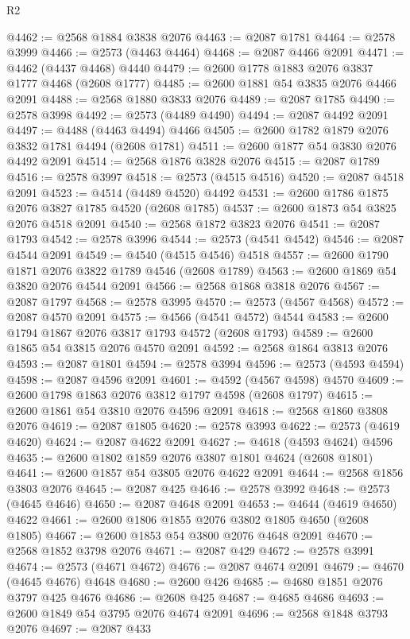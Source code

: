 \begin{lexlean}{R2}
\begin{coremodule}
@4462 := @2568 @1884 @3838 @2076
@4463 := @2087 @1781
@4464 := @2578 @3999
@4466 := @2573 (@4463 @4464)
@4468 := @2087 @4466 @2091
@4471 := @4462 (@4437 @4468) @4440
@4479 := @2600 @1778 @1883 @2076 @3837 @1777 @4468 (@2608 @1777)
@4485 := @2600 @1881 @54 @3835 @2076 @4466 @2091
@4488 := @2568 @1880 @3833 @2076
@4489 := @2087 @1785
@4490 := @2578 @3998
@4492 := @2573 (@4489 @4490)
@4494 := @2087 @4492 @2091
@4497 := @4488 (@4463 @4494) @4466
@4505 := @2600 @1782 @1879 @2076 @3832 @1781 @4494 (@2608 @1781)
@4511 := @2600 @1877 @54 @3830 @2076 @4492 @2091
@4514 := @2568 @1876 @3828 @2076
@4515 := @2087 @1789
@4516 := @2578 @3997
@4518 := @2573 (@4515 @4516)
@4520 := @2087 @4518 @2091
@4523 := @4514 (@4489 @4520) @4492
@4531 := @2600 @1786 @1875 @2076 @3827 @1785 @4520 (@2608 @1785)
@4537 := @2600 @1873 @54 @3825 @2076 @4518 @2091
@4540 := @2568 @1872 @3823 @2076
@4541 := @2087 @1793
@4542 := @2578 @3996
@4544 := @2573 (@4541 @4542)
@4546 := @2087 @4544 @2091
@4549 := @4540 (@4515 @4546) @4518
@4557 := @2600 @1790 @1871 @2076 @3822 @1789 @4546 (@2608 @1789)
@4563 := @2600 @1869 @54 @3820 @2076 @4544 @2091
@4566 := @2568 @1868 @3818 @2076
@4567 := @2087 @1797
@4568 := @2578 @3995
@4570 := @2573 (@4567 @4568)
@4572 := @2087 @4570 @2091
@4575 := @4566 (@4541 @4572) @4544
@4583 := @2600 @1794 @1867 @2076 @3817 @1793 @4572 (@2608 @1793)
@4589 := @2600 @1865 @54 @3815 @2076 @4570 @2091
@4592 := @2568 @1864 @3813 @2076
@4593 := @2087 @1801
@4594 := @2578 @3994
@4596 := @2573 (@4593 @4594)
@4598 := @2087 @4596 @2091
@4601 := @4592 (@4567 @4598) @4570
@4609 := @2600 @1798 @1863 @2076 @3812 @1797 @4598 (@2608 @1797)
@4615 := @2600 @1861 @54 @3810 @2076 @4596 @2091
@4618 := @2568 @1860 @3808 @2076
@4619 := @2087 @1805
@4620 := @2578 @3993
@4622 := @2573 (@4619 @4620)
@4624 := @2087 @4622 @2091
@4627 := @4618 (@4593 @4624) @4596
@4635 := @2600 @1802 @1859 @2076 @3807 @1801 @4624 (@2608 @1801)
@4641 := @2600 @1857 @54 @3805 @2076 @4622 @2091
@4644 := @2568 @1856 @3803 @2076
@4645 := @2087 @425
@4646 := @2578 @3992
@4648 := @2573 (@4645 @4646)
@4650 := @2087 @4648 @2091
@4653 := @4644 (@4619 @4650) @4622
@4661 := @2600 @1806 @1855 @2076 @3802 @1805 @4650 (@2608 @1805)
@4667 := @2600 @1853 @54 @3800 @2076 @4648 @2091
@4670 := @2568 @1852 @3798 @2076
@4671 := @2087 @429
@4672 := @2578 @3991
@4674 := @2573 (@4671 @4672)
@4676 := @2087 @4674 @2091
@4679 := @4670 (@4645 @4676) @4648
@4680 := @2600 @426
@4685 := @4680 @1851 @2076 @3797 @425 @4676
@4686 := @2608 @425
@4687 := @4685 @4686
@4693 := @2600 @1849 @54 @3795 @2076 @4674 @2091
@4696 := @2568 @1848 @3793 @2076
@4697 := @2087 @433

\end{coremodule}
\end{lexlean}
